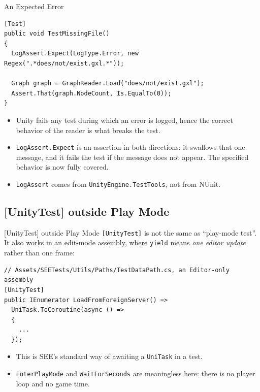 \begin{solutionframe}{An Expected Error}
  \begin{lstlisting}[basicstyle=\scriptsize\ttfamily]
[Test]
public void TestMissingFile()
{
  LogAssert.Expect(LogType.Error, new Regex(".*does/not/exist.gxl.*"));

  Graph graph = GraphReader.Load("does/not/exist.gxl");
  Assert.That(graph.NodeCount, Is.EqualTo(0));
}
  \end{lstlisting}
  \begin{itemize}
    \item Unity fails any test during which an error is logged, hence the
      correct behavior of the reader is what breaks the test.
    \item \texttt{LogAssert.Expect} is an assertion in both directions: it
      swallows that one message, and it fails the test if the message does not
      appear. The specified behavior is now fully covered.
    \item \texttt{LogAssert} comes from \texttt{UnityEngine.TestTools}, not from
      NUnit.
  \end{itemize}
  \vspace{1ex}

\end{solutionframe}

\subsection{[UnityTest] outside Play Mode}

\begin{frame}[fragile]{[UnityTest] outside Play Mode}
  \texttt{[UnityTest]} is not the same as ``play-mode test''. It also works in
  an edit-mode assembly, where \texttt{yield} means \emph{one editor update}
  rather than one frame:
  \vspace{1ex}

  \begin{lstlisting}[basicstyle=\scriptsize\ttfamily]
// Assets/SEETests/Utils/Paths/TestDataPath.cs, an Editor-only assembly
[UnityTest]
public IEnumerator LoadFromForeignServer() =>
  UniTask.ToCoroutine(async () =>
  {
    ...
  });
  \end{lstlisting}
  \vspace{1ex}

  \begin{itemize}
    \item This is SEE's standard way of awaiting a \texttt{UniTask} in a test.
    \item \texttt{EnterPlayMode} and \texttt{WaitForSeconds} are meaningless
      here: there is no player loop and no game time.
  \end{itemize}
  \vspace{2ex}

\end{frame}

